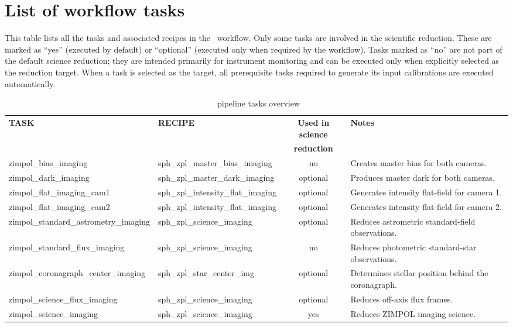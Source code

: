 \section{List of workflow tasks}

This table lists all the tasks and associated recipes in the \instname\ workflow.
Only some tasks are involved in the scientific reduction. These are marked as
``yes'' (executed by default) or ``optional'' (executed only when required by
the workflow). Tasks marked as ``no'' are not part of the default science
reduction; they are intended primarily for instrument monitoring and can be
executed only when explicitly selected as the reduction target. When a task is
selected as the target, all prerequisite tasks required to generate its input
calibrations are executed automatically.

\begin{table}[htbp]
\centering
\scriptsize
\begin{tabular}{|l|l|c|p{7cm}|}
\hline
\textbf{TASK} & \textbf{RECIPE} & \textbf{Used in science} & \textbf{Notes} \\
              &                 & \textbf{reduction} &                \\
\hline 
zimpol\_bias\_imaging & sph\_zpl\_master\_bias\_imaging & no &
Creates master bias for both cameras. \\
zimpol\_dark\_imaging & sph\_zpl\_master\_dark\_imaging & optional &
Produces master dark for both cameras. \\
zimpol\_flat\_imaging\_cam1 & sph\_zpl\_intensity\_flat\_imaging & optional &
Generates intensity flat-field for camera 1. \\
zimpol\_flat\_imaging\_cam2 & sph\_zpl\_intensity\_flat\_imaging & optional &
Generates intensity flat-field for camera 2. \\
zimpol\_standard\_astrometry\_imaging & sph\_zpl\_science\_imaging & optional &
Reduces astrometric standard-field observations. \\
zimpol\_standard\_flux\_imaging & sph\_zpl\_science\_imaging & no &
Reduces photometric standard-star observations. \\
zimpol\_coronagraph\_center\_imaging & sph\_zpl\_star\_center\_img & optional &
Determines stellar position behind the coronagraph. \\
zimpol\_science\_flux\_imaging & sph\_zpl\_science\_imaging & optional &
Reduces off-axis flux frames. \\
zimpol\_science\_imaging & sph\_zpl\_science\_imaging & yes &
Reduces ZIMPOL imaging science. \\
\hline
\end{tabular}
\caption{\instname\ pipeline tasks overview}
\end{table}
